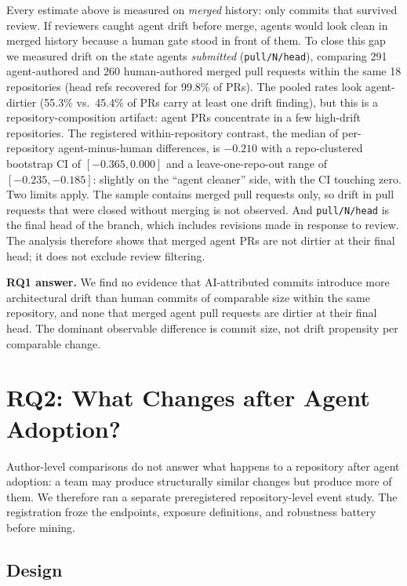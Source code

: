 \documentclass[sigplan,11pt,nonacm=true]{acmart}
\begin{document}
Every estimate above is measured on \emph{merged} history: only commits that
survived review. If reviewers caught agent drift before merge, agents would
look clean in merged history because a human gate stood in front of them. To
close this gap we measured drift on the state agents \emph{submitted}
(\texttt{pull/N/head}), comparing 291 agent-authored and 260 human-authored
merged pull requests within the same 18 repositories (head refs recovered for
99.8\% of PRs). The pooled rates look agent-dirtier (55.3\% vs.\ 45.4\% of PRs
carry at least one drift finding), but this is a repository-composition
artifact: agent PRs concentrate in a few high-drift repositories. The
registered within-repository contrast, the median of per-repository
agent-minus-human differences, is $-0.210$ with a repo-clustered bootstrap
CI of $[-0.365, 0.000]$ and a leave-one-repo-out range of $[-0.235, -0.185]$:
slightly on the ``agent cleaner'' side, with the CI touching zero. Two
limits apply. The sample contains merged pull requests only, so drift in
pull requests that were closed without merging is not observed. And \texttt{pull/N/head} is the final head of
the branch, which includes revisions made in response to review. The analysis
therefore shows that merged agent PRs are not dirtier at their final head;
it does not exclude review filtering.

\medskip
\noindent\textbf{RQ1 answer.} We find no evidence that AI-attributed commits
introduce more architectural drift than human commits of comparable size
within the same repository, and none that merged agent pull requests are
dirtier at their final head. The dominant observable difference is commit size, not drift
propensity per comparable change.

\section{RQ2: What Changes after Agent Adoption?}
\label{sec:rq2}

Author-level comparisons do not answer what happens to a repository after
agent adoption: a team may produce structurally similar changes but produce
more of them. We therefore ran a separate preregistered repository-level event
study. The registration froze the endpoints, exposure definitions, and
robustness battery before mining.

\subsection{Design}
\end{document}
